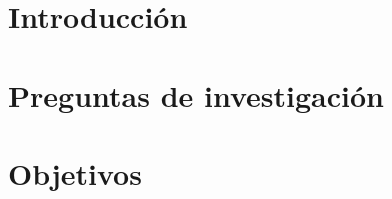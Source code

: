 \documentclass[11pt]{article}
\begin{document}
\section{Introducción}

\vspace{10pt}


\section{Preguntas de investigación}


\section{Objetivos}
\end{document}
